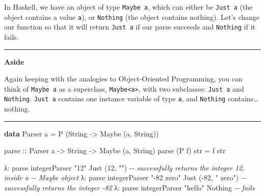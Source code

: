\documentclass[]{article}
\newenvironment{Shaded}{}{}
\newcommand{\CommentTok}[1]{\textcolor[rgb]{0.38,0.63,0.69}{\textit{#1}}}
\newcommand{\DataTypeTok}[1]{\textcolor[rgb]{0.56,0.13,0.00}{#1}}
\newcommand{\DecValTok}[1]{\textcolor[rgb]{0.25,0.63,0.44}{#1}}
\newcommand{\KeywordTok}[1]{\textcolor[rgb]{0.00,0.44,0.13}{\textbf{#1}}}
\newcommand{\NormalTok}[1]{#1}
\newcommand{\OperatorTok}[1]{\textcolor[rgb]{0.40,0.40,0.40}{#1}}
\newcommand{\OtherTok}[1]{\textcolor[rgb]{0.00,0.44,0.13}{#1}}
\newcommand{\StringTok}[1]{\textcolor[rgb]{0.25,0.44,0.63}{#1}}
\begin{document}
In Haskell, we have an object of type \texttt{Maybe\ a}, which can either be
\texttt{Just\ a} (the object contains a value \texttt{a}), or \texttt{Nothing}
(the object contains nothing). Let's change our function so that it will return
\texttt{Just\ a} if our parse succeeds and \texttt{Nothing} if it fails.

\begin{center}\rule{0.5\linewidth}{\linethickness}\end{center}

\textbf{Aside}

Again keeping with the analogies to Object-Oriented Programming, you can think
of \texttt{Maybe\ a} as a superclass, \texttt{Maybe\textless{}a\textgreater{}},
with two subclasses: \texttt{Just\ a} and \texttt{Nothing}. \texttt{Just\ a}
contains one instance variable of type \texttt{a}, and \texttt{Nothing}
contains\ldots nothing.

\begin{center}\rule{0.5\linewidth}{\linethickness}\end{center}

\begin{Shaded}
\begin{Highlighting}[]
\KeywordTok{data} \DataTypeTok{Parser}\NormalTok{ a }\OtherTok{=} \DataTypeTok{P}\NormalTok{ (}\DataTypeTok{String} \OtherTok{{-}>} \DataTypeTok{Maybe}\NormalTok{ (a, }\DataTypeTok{String}\NormalTok{))}

\OtherTok{parse ::} \DataTypeTok{Parser}\NormalTok{ a }\OtherTok{{-}>} \DataTypeTok{String} \OtherTok{{-}>} \DataTypeTok{Maybe}\NormalTok{ (a, }\DataTypeTok{String}\NormalTok{)}
\NormalTok{parse (}\DataTypeTok{P}\NormalTok{ f) str }\OtherTok{=}\NormalTok{ f str}
\end{Highlighting}
\end{Shaded}

\begin{Shaded}
\begin{Highlighting}[]
\NormalTok{λ}\OperatorTok{:}\NormalTok{ parse integerParser }\StringTok{"12"}
\DataTypeTok{Just}\NormalTok{ (}\DecValTok{12}\NormalTok{, }\StringTok{""}\NormalTok{)               }\CommentTok{{-}{-} successfully returns the integer 12, inside a}
                            \CommentTok{{-}{-} Maybe object}
\NormalTok{λ}\OperatorTok{:}\NormalTok{ parse integerParser }\StringTok{"{-}82 zero"}
\DataTypeTok{Just}\NormalTok{ (}\OperatorTok{{-}}\DecValTok{82}\NormalTok{, }\StringTok{" zero"}\NormalTok{)         }\CommentTok{{-}{-} successfully returns the integer {-}82}
\NormalTok{λ}\OperatorTok{:}\NormalTok{ parse integerParser }\StringTok{"hello"}
\DataTypeTok{Nothing}                     \CommentTok{{-}{-} fails}
\end{Highlighting}
\end{Shaded}
\end{document}
